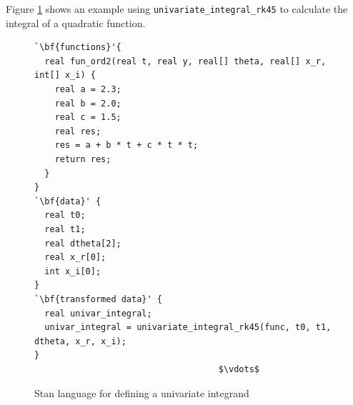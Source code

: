 \documentclass[11pt]{amsart}
\newenvironment{fmpage}[1]
     {\begin{lrbox}{\fmbox}\begin{minipage}{#1}}
     {\end{minipage}\end{lrbox}\fbox{\usebox{\fmbox}}}
\begin{document}
Figure \ref{fig:univariate_int_example} shows an example using
\texttt{univariate\_integral\_rk45} to calculate the
integral of a quadratic function.
\begin{figure}[htbp]
\caption{Stan language for defining a univariate integrand}
\begin{center}
\begin{small}
\begin{fmpage}{\textwidth - .75in}
\begin{lstlisting}[basicstyle=\footnotesize\ttfamily,mathescape=true,flexiblecolumns=true,frame=single,escapeinside=`']
`\bf{functions}'{
  real fun_ord2(real t, real y, real[] theta, real[] x_r, int[] x_i) {
    real a = 2.3;
    real b = 2.0;
    real c = 1.5;
    real res;
    res = a + b * t + c * t * t;
    return res;
  }
}
`\bf{data}' {
  real t0;
  real t1;
  real dtheta[2];
  real x_r[0];
  int x_i[0];
}
`\bf{transformed data}' {
  real univar_integral;
  univar_integral = univariate_integral_rk45(func, t0, t1, dtheta, x_r, x_i);
}
                                    $\vdots$			       
\end{lstlisting}
\end{fmpage}
\end{small}
\end{center}
\label{fig:univariate_int_example}
\end{figure}
\end{document}
